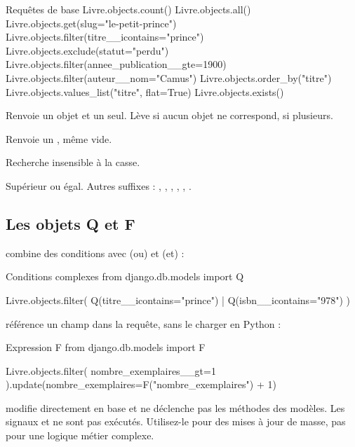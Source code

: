 \begin{codebox}[python]{Requêtes de base}
Livre.objects.count()
Livre.objects.all()
Livre.objects.get(slug="le-petit-prince")
Livre.objects.filter(titre__icontains="prince")
Livre.objects.exclude(statut="perdu")
Livre.objects.filter(annee_publication__gte=1900)
Livre.objects.filter(auteur__nom="Camus")
Livre.objects.order_by("titre")
Livre.objects.values_list("titre", flat=True)
Livre.objects.exists()
\end{codebox}

\begin{description}[leftmargin=4.2cm,style=nextline]
  \item[\code{get()}] Renvoie un objet et un seul. Lève  si
  aucun objet ne correspond,  si plusieurs.
  \item[\code{filter()}] Renvoie un , même vide.
  \item[\code{icontains}] Recherche insensible à la casse.
  \item[\code{gte}] Supérieur ou égal. Autres suffixes : , ,
  , , , .
\end{description}

\subsection{Les objets Q et F}

 combine des conditions avec \code{|} (ou) et \code{\&} (et) :

\begin{codebox}[python]{Conditions complexes}
from django.db.models import Q

Livre.objects.filter(
    Q(titre__icontains="prince") | Q(isbn__icontains="978")
)
\end{codebox}

 référence un champ dans la requête, sans le charger en Python :

\begin{codebox}[python]{Expression F}
from django.db.models import F

Livre.objects.filter(
    nombre_exemplaires__gt=1
).update(nombre_exemplaires=F("nombre_exemplaires") + 1)
\end{codebox}

\begin{attention}
 modifie directement en base et ne déclenche pas les méthodes
 des modèles. Les signaux  et  ne
sont pas exécutés. Utilisez-le pour des mises à jour de masse, pas pour une
logique métier complexe.
\end{attention}

